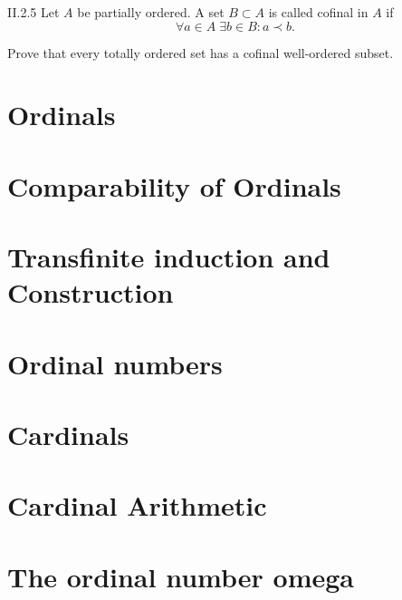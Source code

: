 \begin{problem}{II.2.5}
Let \( A \) be partially ordered. A set \( B \subset A \) is called cofinal in \(A\) if
\[
	\forall a\in A\; \exists b\in B: a \prec b.
\]

Prove that every totally ordered set has a cofinal well-ordered subset.
\end{problem}


\section{Ordinals}

\section{Comparability of Ordinals}

\section{Transfinite induction and Construction}

\section{Ordinal numbers}

\section{Cardinals}

\section{Cardinal Arithmetic}

\section{The ordinal number omega}
